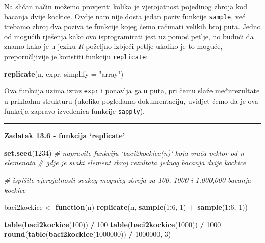 \documentclass[]{book}
\newenvironment{Shaded}{\begin{snugshade}}{\end{snugshade}}
\newcommand{\KeywordTok}[1]{\textcolor[rgb]{0.13,0.29,0.53}{\textbf{#1}}}
\newcommand{\DataTypeTok}[1]{\textcolor[rgb]{0.13,0.29,0.53}{#1}}
\newcommand{\DecValTok}[1]{\textcolor[rgb]{0.00,0.00,0.81}{#1}}
\newcommand{\StringTok}[1]{\textcolor[rgb]{0.31,0.60,0.02}{#1}}
\newcommand{\CommentTok}[1]{\textcolor[rgb]{0.56,0.35,0.01}{\textit{#1}}}
\newcommand{\ControlFlowTok}[1]{\textcolor[rgb]{0.13,0.29,0.53}{\textbf{#1}}}
\newcommand{\OperatorTok}[1]{\textcolor[rgb]{0.81,0.36,0.00}{\textbf{#1}}}
\newcommand{\NormalTok}[1]{#1}
\theoremstyle{definition}
\theoremstyle{definition}
\theoremstyle{definition}
\theoremstyle{remark}
\begin{document}
Na sličan način možemo provjeriti kolika je vjerojatnost pojedinog
zbroja kod bacanja dvije kockice. Ovdje nam nije dosta jedan poziv
funkcije \texttt{sample}, već trebamo zbroj dva poziva te funkcije kojeg
ćemo računati velikih broj puta. Jedno od mogućih rješenja kako ovo
isprogramirati jest uz pomoć petlje, no budući da znamo kako je u jeziku
\emph{R} poželjno izbjeći petlje ukoliko je to moguće, preporučljivije
je koristiti funkciju \texttt{replicate}:

\begin{Shaded}
\begin{Highlighting}[]
\KeywordTok{replicate}\NormalTok{(n, expr, }\DataTypeTok{simplify =} \StringTok{"array"}\NormalTok{)}
\end{Highlighting}
\end{Shaded}

Ova funkcija uzima izraz \texttt{expr} i ponavlja ga \texttt{n} puta,
pri čemu slaže međurezultate u prikladnu strukturu (ukoliko pogledamo
dokumentaciju, uvidjet ćemo da je ova funkcija zapravo izvedenica
funkcije \texttt{sapply}).

\begin{center}\rule{0.5\linewidth}{\linethickness}\end{center}

\textbf{Zadatak 13.6 - funkcija `replicate'}

\begin{Shaded}
\begin{Highlighting}[]
\KeywordTok{set.seed}\NormalTok{(}\DecValTok{1234}\NormalTok{)}
\CommentTok{# napravite funkciju `baci2kockice(n)` koja vraća vektor od n elemenata}
\CommentTok{# gdje je svaki element zbroj rezultata jednog bacanja dvije kockice}

\CommentTok{# ispišite vjerojatnosti svakog mogućeg zbroja za 100, 1000 i 1,000,000 bacanja kockice}
\end{Highlighting}
\end{Shaded}

\begin{Shaded}
\begin{Highlighting}[]
\NormalTok{baci2kockice <-}\StringTok{ }\ControlFlowTok{function}\NormalTok{(n) }
  \KeywordTok{replicate}\NormalTok{(n, }\KeywordTok{sample}\NormalTok{(}\DecValTok{1}\OperatorTok{:}\DecValTok{6}\NormalTok{, }\DecValTok{1}\NormalTok{) }\OperatorTok{+}\StringTok{ }\KeywordTok{sample}\NormalTok{(}\DecValTok{1}\OperatorTok{:}\DecValTok{6}\NormalTok{, }\DecValTok{1}\NormalTok{))}

\KeywordTok{table}\NormalTok{(}\KeywordTok{baci2kockice}\NormalTok{(}\DecValTok{100}\NormalTok{)) }\OperatorTok{/}\StringTok{ }\DecValTok{100}
\KeywordTok{table}\NormalTok{(}\KeywordTok{baci2kockice}\NormalTok{(}\DecValTok{1000}\NormalTok{)) }\OperatorTok{/}\StringTok{ }\DecValTok{1000}
\KeywordTok{round}\NormalTok{(}\KeywordTok{table}\NormalTok{(}\KeywordTok{baci2kockice}\NormalTok{(}\DecValTok{1000000}\NormalTok{)) }\OperatorTok{/}\StringTok{ }\DecValTok{1000000}\NormalTok{, }\DecValTok{3}\NormalTok{)}
\end{Highlighting}
\end{Shaded}
\end{document}
